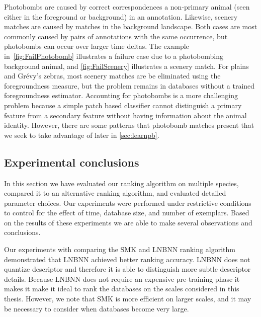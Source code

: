             Photobombs are caused by correct correspondences a non-primary animal (seen either in the foreground or
            background) in an annotation. Likewise, scenery matches are caused by matches in the background
            landscape. Both cases are most commonly caused by pairs of annotations with the same occurrence, but
            photobombs can occur over larger time deltas. The example in~\cref{fig:FailPhotobomb} illustrates a
            failure case due to a photobombing background animal, and \cref{fig:FailScenery} illustrates a scenery
            match. For plains and Grévy's zebras, most scenery matches are be eliminated using the foregroundness
            measure, but the problem remains in databases without a trained foregroundness estimator. Accounting
            for photobombs is a more challenging problem because a simple patch based classifier cannot distinguish
            a primary feature from a  secondary feature without having information about the animal identity.
            However, there are some patterns that photobomb matches present that we seek to take advantage of later
            in \cref{sec:learnpb}.

            \FailScenery{}
            \FailPhotobomb{}

    \FloatBarrier{}
    \subsection{Experimental conclusions}\label{sub:exptsum}  

        In this section we have evaluated our ranking algorithm on multiple species, compared it to an alternative
        ranking algorithm, and evaluated detailed parameter choices. Our experiments were performed under
        restrictive conditions to control for the effect of time, database size, and number of exemplars. Based on
        the results of these experiments we are able to make several observations and conclusions.

        Our experiments with comparing the SMK and LNBNN ranking algorithm demonstrated that LNBNN achieved better
        ranking accuracy. LNBNN does not quantize descriptor and therefore it is able to distinguish more subtle
        descriptor details. Because LNBNN does not require an expensive pre-training phase it makes it make it
        ideal to rank the databases on the scales considered in this thesis. However, we note that SMK is more
        efficient on larger scales, and it may be necessary to consider when databases become very large.


